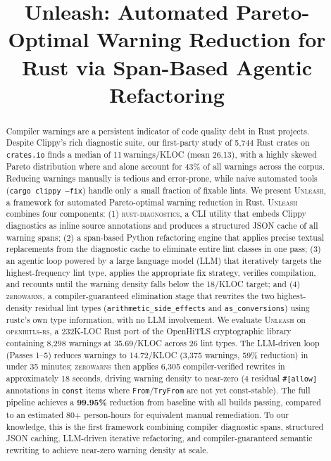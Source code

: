 \documentclass[sigconf,review,anonymous]{acmart}
\newcommand{\tool}{\textsc{Unleash}\xspace}
\newcommand{\rd}{\textsc{rust-diagnostics}\xspace}
\newcommand{\zerowarns}{\textsc{zerowarns}\xspace}
\newcommand{\tcode}{\path}
\begin{document}
\title{Unleash: Automated Pareto-Optimal Warning Reduction for Rust via Span-Based Agentic Refactoring}

\begin{abstract}
Compiler warnings are a persistent indicator of code quality debt in Rust projects.
Despite Clippy's rich diagnostic suite, our first-party study of 5,744 Rust
crates on \texttt{crates.io} finds a median of 11\,warnings/KLOC (mean 26.13),
with a highly skewed Pareto distribution where \tcode{arithmetic\_side\_effects}
and \tcode{as\_conversions} alone account for 43\% of all warnings
across the corpus.
Reducing warnings manually is tedious and error-prone, while naive automated tools
(\texttt{cargo clippy --fix}) handle only a small fraction of fixable lints.
We present \tool, a framework for automated Pareto-optimal warning reduction in Rust.
\tool combines four components: (1) \rd, a CLI utility that embeds Clippy diagnostics
as inline source annotations and produces a structured JSON cache of all warning spans;
(2) a span-based Python refactoring engine that applies precise textual replacements
from the diagnostic cache to eliminate entire lint classes in one pass; (3) an
agentic loop powered by a large language model (LLM) that iteratively targets the
highest-frequency lint type, applies the appropriate fix strategy, verifies compilation,
and recounts until the warning density falls below the 18/KLOC target; and (4)
\zerowarns, a compiler-guaranteed elimination stage that rewrites the two
highest-density residual lint types (\texttt{arithmetic\_side\_effects} and
\texttt{as\_conversions}) using rustc's own type information, with no LLM involvement.
We evaluate \tool on \textsc{openhitls-rs}, a 232K-LOC Rust port of the OpenHiTLS
cryptographic library containing 8,298 warnings at 35.69/KLOC across 26 lint types.
The LLM-driven loop (Passes 1--5) reduces warnings to 14.72/KLOC (3,375 warnings,
59\% reduction) in under 35 minutes; \zerowarns then applies 6,305 compiler-verified
rewrites in approximately 18 seconds, driving warning density to near-zero
(4 residual \texttt{\#[allow]} annotations in \texttt{const} items where
\texttt{From}/\texttt{TryFrom} are not yet const-stable).
The full pipeline achieves a \textbf{99.95\%} reduction from baseline with all builds
passing, compared to an estimated 80+ person-hours for equivalent manual remediation.
To our knowledge, this is the first framework combining compiler diagnostic spans,
structured JSON caching, LLM-driven iterative refactoring, and compiler-guaranteed
semantic rewriting to achieve near-zero warning density at scale.
\end{abstract}
\end{document}
